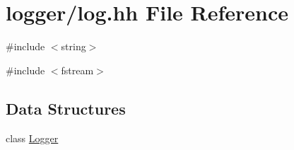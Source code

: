 \hypertarget{log_8hh}{
\section{logger/log.hh File Reference}
\label{log_8hh}
}
{\ttfamily \#include $<$string$>$}\par
{\ttfamily \#include $<$fstream$>$}\par
\subsection*{Data Structures}
\begin{DoxyCompactItemize}
\item 
class \hyperlink{classLogger}{Logger}
\end{DoxyCompactItemize}
